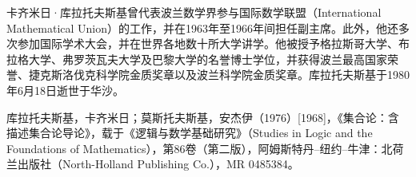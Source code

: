 卡齐米日·库拉托夫斯基曾代表波兰数学界参与国际数学联盟（International Mathematical Union）的工作，并在1963年至1966年间担任副主席。此外，他还多次参加国际学术大会，并在世界各地数十所大学讲学。他被授予格拉斯哥大学、布拉格大学、弗罗茨瓦夫大学及巴黎大学的名誉博士学位，并获得波兰最高国家荣誉、捷克斯洛伐克科学院金质奖章以及波兰科学院金质奖章。库拉托夫斯基于1980年6月18日逝世于华沙。

库拉托夫斯基，卡齐米日；莫斯托夫斯基，安杰伊（1976）[1968]，《集合论：含描述集合论导论》，载于《逻辑与数学基础研究》（Studies in Logic and the Foundations of Mathematics），第86卷（第二版），阿姆斯特丹–纽约–牛津：北荷兰出版社（North-Holland Publishing Co.），MR 0485384。

